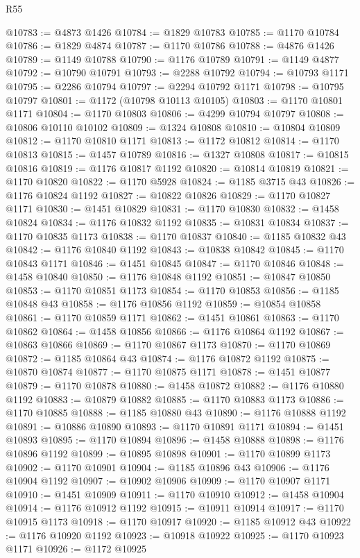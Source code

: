 \begin{lexlean}{R55}
\begin{coremodule}
@10783 := @4873 @1426
@10784 := @1829 @10783
@10785 := @1170 @10784
@10786 := @1829 @4874
@10787 := @1170 @10786
@10788 := @4876 @1426
@10789 := @1149 @10788
@10790 := @1176 @10789
@10791 := @1149 @4877
@10792 := @10790 @10791
@10793 := @2288 @10792
@10794 := @10793 @1171
@10795 := @2286 @10794
@10797 := @2294 @10792 @1171
@10798 := @10795 @10797
@10801 := @1172 (@10798 @10113 @10105)
@10803 := @1170 @10801 @1171
@10804 := @1170 @10803
@10806 := @4299 @10794 @10797
@10808 := @10806 @10110 @10102
@10809 := @1324 @10808
@10810 := @10804 @10809
@10812 := @1170 @10810 @1171
@10813 := @1172 @10812
@10814 := @1170 @10813
@10815 := @1457 @10789
@10816 := @1327 @10808
@10817 := @10815 @10816
@10819 := @1176 @10817 @1192
@10820 := @10814 @10819
@10821 := @1170 @10820
@10822 := @1170 @5928
@10824 := @1185 @3715 @43
@10826 := @1176 @10824 @1192
@10827 := @10822 @10826
@10829 := @1170 @10827 @1171
@10830 := @1451 @10829
@10831 := @1170 @10830
@10832 := @1458 @10824
@10834 := @1176 @10832 @1192
@10835 := @10831 @10834
@10837 := @1170 @10835 @1173
@10838 := @1170 @10837
@10840 := @1185 @10832 @43
@10842 := @1176 @10840 @1192
@10843 := @10838 @10842
@10845 := @1170 @10843 @1171
@10846 := @1451 @10845
@10847 := @1170 @10846
@10848 := @1458 @10840
@10850 := @1176 @10848 @1192
@10851 := @10847 @10850
@10853 := @1170 @10851 @1173
@10854 := @1170 @10853
@10856 := @1185 @10848 @43
@10858 := @1176 @10856 @1192
@10859 := @10854 @10858
@10861 := @1170 @10859 @1171
@10862 := @1451 @10861
@10863 := @1170 @10862
@10864 := @1458 @10856
@10866 := @1176 @10864 @1192
@10867 := @10863 @10866
@10869 := @1170 @10867 @1173
@10870 := @1170 @10869
@10872 := @1185 @10864 @43
@10874 := @1176 @10872 @1192
@10875 := @10870 @10874
@10877 := @1170 @10875 @1171
@10878 := @1451 @10877
@10879 := @1170 @10878
@10880 := @1458 @10872
@10882 := @1176 @10880 @1192
@10883 := @10879 @10882
@10885 := @1170 @10883 @1173
@10886 := @1170 @10885
@10888 := @1185 @10880 @43
@10890 := @1176 @10888 @1192
@10891 := @10886 @10890
@10893 := @1170 @10891 @1171
@10894 := @1451 @10893
@10895 := @1170 @10894
@10896 := @1458 @10888
@10898 := @1176 @10896 @1192
@10899 := @10895 @10898
@10901 := @1170 @10899 @1173
@10902 := @1170 @10901
@10904 := @1185 @10896 @43
@10906 := @1176 @10904 @1192
@10907 := @10902 @10906
@10909 := @1170 @10907 @1171
@10910 := @1451 @10909
@10911 := @1170 @10910
@10912 := @1458 @10904
@10914 := @1176 @10912 @1192
@10915 := @10911 @10914
@10917 := @1170 @10915 @1173
@10918 := @1170 @10917
@10920 := @1185 @10912 @43
@10922 := @1176 @10920 @1192
@10923 := @10918 @10922
@10925 := @1170 @10923 @1171
@10926 := @1172 @10925

\end{coremodule}
\end{lexlean}

